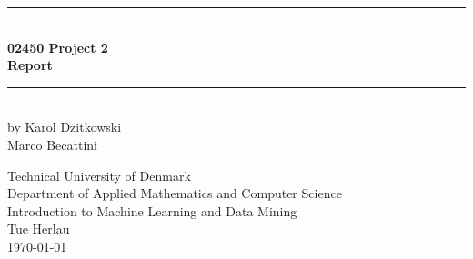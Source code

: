 \begin{titlingpage}
\centering \parindent=0pt
\newcommand{\HRule}{\rule{\textwidth}{1mm}}
 \HRule\\[1cm]\Huge\bfseries
02450 Project 2\\[0.7cm]
\large Report\\[1cm]
\HRule\\[4cm]  
\large by Karol Dzitkowski\\
Marco Becattini\\
 \normalsize %
\begin{flushleft}
Technical University of Denmark\\
Department of Applied Mathematics and Computer Science\\
Introduction to Machine Learning and Data Mining\\
Tue Herlau\\
\today \end{flushleft}
\end{titlingpage}
